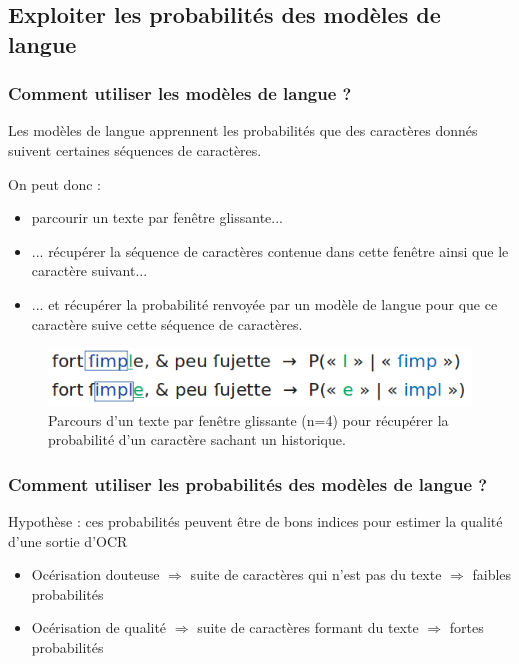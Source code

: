 \documentclass{beamer}
\begin{document}
		\subsection{Exploiter les probabilités des modèles de langue}
		\begin{frame}\frametitle{Comment utiliser les modèles de langue ?}
			Les modèles de langue apprennent les probabilités que des caractères donnés suivent certaines séquences de caractères. 

			On peut donc :
			\begin{itemize}
				\item parcourir un texte par fenêtre glissante...
				\item ... récupérer la séquence de caractères contenue dans cette fenêtre ainsi que le caractère suivant...
				\item ... et récupérer la probabilité renvoyée par un modèle de langue pour que ce caractère suive cette séquence de caractères.
			\end{itemize}

			\begin{figure}[htbp] 
			\begin{center} 
			\includegraphics[scale=0.4]{Ex_proba_LM.png}
			\end{center} 
			\caption{Parcours d'un texte par fenêtre glissante (n=4) pour récupérer la probabilité d'un caractère sachant un historique.} 
			\end{figure}

		\end{frame}
		\begin{frame}\frametitle{Comment utiliser les probabilités des modèles de langue ?}	
			Hypothèse : ces probabilités peuvent être de bons indices pour estimer la qualité d'une sortie d'OCR 
			\begin{itemize}
				\item Océrisation douteuse $\Rightarrow$ suite de caractères qui n'est pas du texte $\Rightarrow$ faibles probabilités
				\item Océrisation de qualité $\Rightarrow$ suite de caractères formant du texte $\Rightarrow$ fortes probabilités
			\end{itemize}
		\end{frame}
\end{document}
